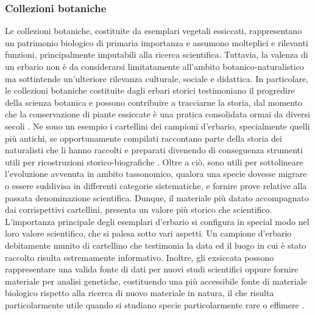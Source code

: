 \documentclass[main.tex]{subfiles}
\begin{document}
\subsubsection{Collezioni botaniche}

Le collezioni botaniche, costituite da esemplari vegetali essiccati, rappresentano un patrimonio biologico di primaria importanza e assumono molteplici e rilevanti funzioni, principalmente imputabili alla ricerca scientifica. Tuttavia, la valenza di un erbario non è da considerarsi limitatamente all’ambito botanico-naturalistico ma sottintende un’ulteriore rilevanza culturale, sociale e didattica.
In particolare, le collezioni botaniche costituite dagli erbari storici testimoniano il progredire della scienza botanica e possono contribuire a tracciarne la storia, dal momento che la conservazione di piante essiccate è una pratica consolidata ormai da diversi secoli \citep{moggi}. Ne sono un esempio i cartellini dei campioni d’erbario, specialmente quelli più antichi, se opportunamente compilati raccontano parte della storia dei naturalisti che li hanno raccolti e preparati divenendo di conseguenza strumenti utili per ricostruzioni storico-biografiche \citep{bonin}. Oltre a ciò, sono utili per sottolineare l’evoluzione avvenuta in ambito tassonomico, qualora una specie dovesse migrare o essere suddivisa in differenti categorie sistematiche, e fornire prove relative alla passata denominazione scientifica. Dunque, il materiale più datato accompagnato dai corrispettivi cartellini, presenta un valore più storico che scientifico.
L’importanza principale degli esemplari d’erbario si configura in special modo nel loro valore scientifico, che si palesa sotto vari aspetti. Un campione d’erbario debitamente munito di cartellino che testimonia la data ed il luogo in cui è stato raccolto risulta estremamente informativo. Inoltre, gli exsiccata possono rappresentare una valida fonte di dati per nuovi studi scientifici oppure fornire materiale per analisi genetiche, costituendo una più accessibile fonte di materiale biologico rispetto alla ricerca di nuovo materiale in natura, il che risulta particolarmente utile quando si studiano specie particolarmente rare o effimere \citep{greve}.
\end{document}
